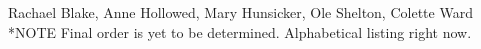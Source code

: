 Rachael Blake,
Anne Hollowed,
Mary Hunsicker, 
Ole Shelton,
Colette Ward
*NOTE Final order is yet to be determined. Alphabetical listing right now. 
